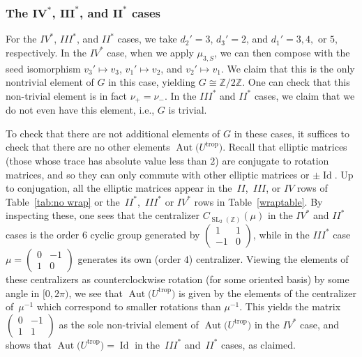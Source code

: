\documentclass[10pt,a4paper]{amsart}
\numberwithin{equation}{section}
\numberwithin{figure}{section}
\numberwithin{table}{section}
\DeclareMathOperator{\Id}{Id}
\DeclareMathOperator{\SL}{SL}
\DeclareMathOperator{\trop}{trop}
\DeclareMathOperator{\Aut}{Aut}
\let\bb=\mathbb
\theoremstyle{definition}
\begin{document}
\subsubsection[The $IV^*$, $III^*$, and $II^*$ cases]{The $\boldsymbol{IV^*}$, $\boldsymbol{III^*}$, and $\boldsymbol{II^*}$ cases}

For the $IV^*$, $III^*$, and $II^*$ cases, we take $d_2'=3$, $d_3'=2$, and $d_1'=3,4,$ or $5$, respectively. In the $IV^*$ case, when we apply $\mu_{3,S}$, we can then compose with the seed isomorphism $v_3'\mapsto v_3$, $v_1'\mapsto v_2$, and $v_2'\mapsto v_1$. We claim that this is the only nontrivial element of $G$ in this case, yielding $G\cong \bb{Z}/2\bb{Z}$. One can check that this non-trivial element is in fact $\nu_{+}=\nu_-$. In the $III^*$ and $II^*$ cases, we claim that we do not even have this element, i.e., $G$ is trivial.

To check that there are not additional elements of $G$ in these cases, it suffices to check that there are no other elements $\Aut\big(U^{\trop}\big)$. Recall that elliptic matrices (those whose trace has absolute value less than $2$) are conjugate to rotation matrices, and so they can only commute with other elliptic matrices or $\pm \Id$. Up to conjugation, all the elliptic matrices appear in the~$II$,~$III$, or $IV$ rows of Table~\ref{tab:no wrap} or the~$II^*$,~$III^*$ or $IV^*$ rows in Table~\ref{wraptable}. By inspecting these, one sees that the centralizer $C_{\SL_2(\bb{Z})}(\mu)$ in the $IV^*$ and $II^*$ cases is the order $6$ cyclic group generated by $\left(\begin{smallmatrix} 1 & 1 \\ -1 & 0\end{smallmatrix}\right)$, while in the $III^*$ case $\mu=\left(\begin{smallmatrix} 0 & -1 \\ 1 & 0\end{smallmatrix}\right)$ generates its own (order $4$) centralizer. Viewing the elements of these centralizers as counterclockwise rotation (for some oriented basis) by some angle in $[0,2\pi)$, we see that $\Aut\big(U^{\trop}\big)$ is given by the elements of the centralizer of~$\mu^{-1}$ which correspond to smaller rotations than $\mu^{-1}$. This yields the matrix $\left(\begin{smallmatrix} 0 & -1 \\ 1 & 1\end{smallmatrix}\right)$ as the sole non-trivial element of $\Aut\big(U^{\trop}\big)$ in the $IV^*$ case, and shows that $\Aut\big(U^{\trop}\big)={\Id}$ in the~$III^*$ and~$II^*$ cases, as claimed.
\end{document}
